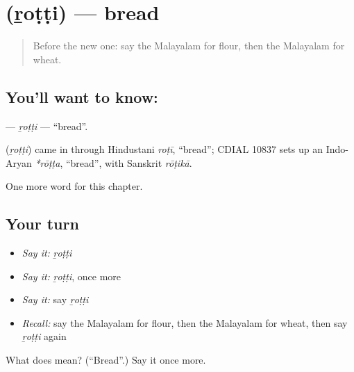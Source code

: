 \section[\texorpdfstring{\ml{റൊട്ടി} (ṟoṭṭi)}{റൊട്ടി (ṟoṭṭi)}]{ (ṟoṭṭi) — bread}

\label{lesson:ML-C249-rotti}



\begin{quote}
Before the new one: say the Malayalam for flour, then the Malayalam for wheat.
\end{quote}

\subsection*{You'll want to know: }
\textbf{} — \emph{ṟoṭṭi} — \textquotedblleft{}bread\textquotedblright{}.

\begin{cousinweb}
\textbf{} (\emph{ṟoṭṭi}) came in through Hindustani \emph{roṭī}, \textquotedblleft{}bread\textquotedblright{}; CDIAL 10837 sets up an Indo-Aryan \emph{*rōṭṭa}, \textquotedblleft{}bread\textquotedblright{}, with Sanskrit \emph{rōṭikā}.
\end{cousinweb}

\begin{grammarlens}[title={What you've built}]
One more word for this chapter.
\end{grammarlens}

\subsection*{Your turn}
\begin{itemize}
\raggedright
  \item \emph{Say it:} \emph{ṟoṭṭi}
  \item \emph{Say it:} \emph{ṟoṭṭi}, once more
  \item \emph{Say it:} say \emph{ṟoṭṭi}
  \item \emph{Recall:} say the Malayalam for flour, then the Malayalam for wheat, then say \emph{ṟoṭṭi} again
\end{itemize}

\begin{tcolorbox}[breakable,colback=teal!4,colframe=teal!35!black,title={Before you move on}]
What does  mean? (\textquotedblleft{}Bread\textquotedblright{}.) Say it once more.
\end{tcolorbox}
